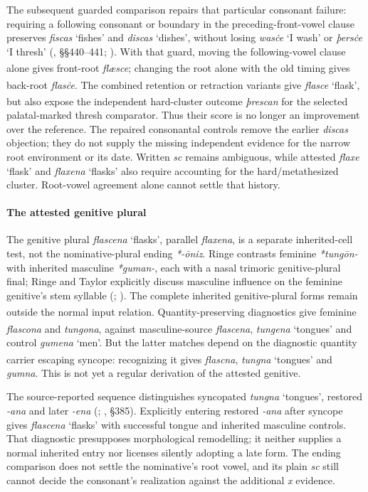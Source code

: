 \documentclass[
  british,
  a4paper,
]{article}
\providecommand{\Pred}[1]{\textsuperscript{\dag}\emph{#1}}
\begin{document}
The subsequent guarded comparison repairs that particular consonant
failure: requiring a following consonant or boundary in the
preceding-front-vowel clause preserves \emph{fiscas} `fishes' and
\emph{discas} `dishes', without losing \emph{wasċe} `I wash' or
\emph{þersċe} `I thresh' (, §§440--441; ). With that guard, moving the following-vowel clause alone
gives front-root \Pred{flæsce}; changing the root alone with the old
timing gives back-root \Pred{flasċe}. The combined retention or
retraction variants give \emph{flasce} `flask', but also expose the
independent hard-cluster outcome \Pred{þrescan} for the selected
palatal-marked thresh comparator. Thus their score is no longer an
improvement over the reference. The repaired consonantal controls remove
the earlier \emph{discas} objection; they do not supply the missing
independent evidence for the narrow root environment or its date.
Written \emph{sc} remains ambiguous, while attested \emph{flaxe} `flask'
and \emph{flaxena} `flasks' also require accounting for the
hard/metathesized cluster. Root-vowel agreement alone cannot settle that
history.

\paragraph{The attested genitive
plural}\label{the-attested-genitive-plural}

The genitive plural \emph{flascena} `flasks', parallel \emph{flaxena},
is a separate inherited-cell test, not the nominative-plural ending
\emph{*-ōniz}. Ringe contrasts feminine \emph{*tungōn-} with inherited
masculine \emph{*guman-}, each with a nasal trimoric genitive-plural
final; Ringe and Taylor explicitly discuss masculine influence on the
feminine genitive's stem syllable (; ). The complete inherited genitive-plural forms remain outside
the normal input relation. Quantity-preserving diagnostics give feminine
\Pred{flascona} and \Pred{tungona}, against masculine-source
\emph{flascena}, \emph{tungena} `tongues' and control \emph{gumena}
`men'. But the latter matches depend on the diagnostic quantity carrier
escaping syncope: recognizing it gives \Pred{flascna}, \emph{tungna}
`tongues' and \Pred{gumna}. This is not yet a regular derivation of the
attested genitive.

The source-reported sequence distinguishes syncopated \emph{tungna}
`tongues', restored \emph{-ana} and later \emph{-ena}
(;
, §385). Explicitly
entering restored \emph{-ana} after syncope gives \emph{flascena}
`flasks' with successful tongue and inherited masculine controls. That
diagnostic presupposes morphological remodelling; it neither supplies a
normal inherited entry nor licenses silently adopting a late form. The
ending comparison does not settle the nominative's root vowel, and its
plain \emph{sc} still cannot decide the consonant's realization against
the additional \emph{x} evidence.
\end{document}
